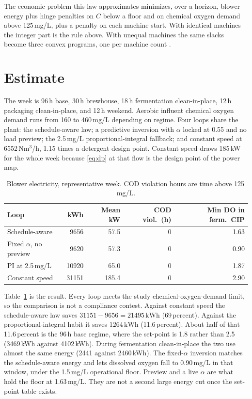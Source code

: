 \documentclass[11pt,a4paper]{article}
\begin{document}
The economic problem this law approximates minimizes, over a horizon, blower energy plus hinge penalties on \(C\) below a floor and on chemical oxygen demand above 125\,mg/L, plus a penalty on each machine start. With identical machines the integer part is the rule above. With unequal machines the same slacks become three convex programs, one per machine count \cite{bemporad1999,rawlings2017}.

\section{Estimate}

The week is 96\,h base, 30\,h brewhouse, 18\,h fermentation clean-in-place, 12\,h packaging clean-in-place, and 12\,h weekend. Aerobic influent chemical oxygen demand runs from 160 to 460\,mg/L depending on regime. Four loops share the plant: the schedule-aware law; a predictive inversion with \(\alpha\) locked at 0.55 and no load preview; the 2.5\,mg/L proportional-integral fallback; and constant speed at 6552\,Nm\(^{3}\)/h, 1.15 times a detergent design point. Constant speed draws 185\,kW for the whole week because \eqref{eq:dp} at that flow is the design point of the power map.

\begin{table}[ht]
\centering
\caption{Blower electricity, representative week. COD violation hours are time above 125\,mg/L.}
\label{tab:week}
\small
\begin{tabular}{@{}lrrrr@{}}
\toprule
Loop & kWh & Mean kW & COD viol.\ (h) & Min DO in ferm.\ CIP \\
\midrule
Schedule-aware & 9656 & 57.5 & 0 & 1.63 \\
Fixed \(\alpha\), no preview & 9620 & 57.3 & 0 & 0.90 \\
PI at 2.5\,mg/L & 10920 & 65.0 & 0 & 1.87 \\
Constant speed & 31151 & 185.4 & 0 & 2.90 \\
\bottomrule
\end{tabular}
\end{table}

Table~\ref{tab:week} is the result. Every loop meets the study chemical-oxygen-demand limit, so the comparison is not a compliance contest. Against constant speed the schedule-aware law saves \(31151-9656=21495\,\mathrm{kWh}\) (69\,percent). Against the proportional-integral habit it saves \(1264\,\mathrm{kWh}\) (11.6\,percent). About half of that 11.6\,percent is the 96\,h base regime, where the set-point is 1.8 rather than 2.5 (3469\,kWh against 4102\,kWh). During fermentation clean-in-place the two use almost the same energy (2441 against 2460\,kWh). The fixed-\(\alpha\) inversion matches the schedule-aware energy and lets dissolved oxygen fall to 0.90\,mg/L in that window, under the 1.5\,mg/L operational floor. Preview and a live \(\alpha\) are what hold the floor at 1.63\,mg/L. They are not a second large energy cut once the set-point table exists.
\end{document}
